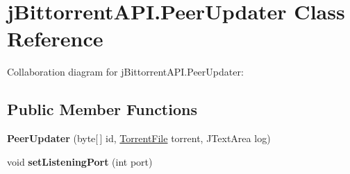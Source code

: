\hypertarget{classj_bittorrent_a_p_i_1_1_peer_updater}{
\section{jBittorrentAPI.PeerUpdater Class Reference}
\label{classj_bittorrent_a_p_i_1_1_peer_updater}
}
Collaboration diagram for jBittorrentAPI.PeerUpdater:\subsection*{Public Member Functions}
\begin{DoxyCompactItemize}
\item 
\hypertarget{classj_bittorrent_a_p_i_1_1_peer_updater_a3d5026cd5e9e8aee6d17425bba6059c9}{
{\bfseries PeerUpdater} (byte\mbox{[}$\,$\mbox{]} id, \hyperlink{classj_bittorrent_a_p_i_1_1_torrent_file}{TorrentFile} torrent, JTextArea log)}
\label{classj_bittorrent_a_p_i_1_1_peer_updater_a3d5026cd5e9e8aee6d17425bba6059c9}

\item 
\hypertarget{classj_bittorrent_a_p_i_1_1_peer_updater_ac168e504c0b91496304f06cf796a7fb6}{
void {\bfseries setListeningPort} (int port)}
\label{classj_bittorrent_a_p_i_1_1_peer_updater_ac168e504c0b91496304f06cf796a7fb6}


\end{DoxyCompactItemize}
